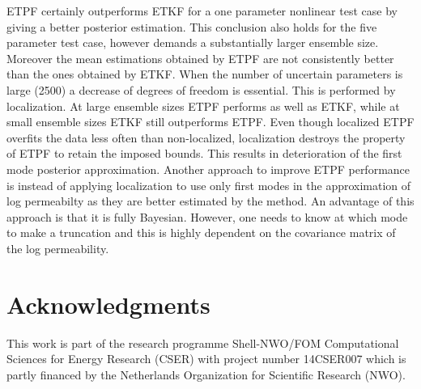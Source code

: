 \documentclass[12, a4paper]{article}
\numberwithin{equation}{section}
\begin{document}
ETPF certainly outperforms ETKF for a one parameter nonlinear test case by giving a better posterior estimation. This conclusion also holds for the five parameter test case, however demands a substantially larger ensemble size. Moreover the mean estimations obtained by ETPF are not consistently better than the ones obtained by ETKF. 
When the number of uncertain parameters is large (2500) a decrease of degrees of freedom is essential. This is performed by  localization. At large ensemble sizes ETPF performs as well as ETKF, while at small ensemble sizes ETKF still outperforms ETPF.
Even though localized ETPF overfits the data less often than non-localized, localization destroys the property of ETPF to retain the imposed bounds. This results in deterioration of the first mode posterior approximation. Another approach to improve ETPF performance is instead of applying localization to use only first modes in the approximation of log permeabilty as they are better estimated by the method. An advantage of this approach is that it is fully Bayesian. However, one needs to know at which mode to make a truncation and this is highly dependent on the covariance matrix of the log permeability.   
     

\section*{Acknowledgments} 
This work is part of the research programme Shell-NWO/FOM Computational Sciences for Energy Research (CSER) with project number 14CSER007 which is partly financed by the Netherlands Organization for Scientific Research (NWO). 

		




		
	
\end{document}
